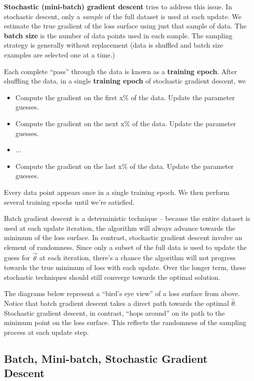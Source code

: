 \documentclass[
  letterpaper,
  DIV=11,
  numbers=noendperiod]{scrreprt}
\providecommand{\tightlist}{%
  \setlength{\itemsep}{0pt}\setlength{\parskip}{0pt}}\usepackage{longtable,booktabs,array}
\begin{document}
\textbf{Stochastic (mini-batch) gradient descent} tries to address this
issue. In stochastic descent, only a \emph{sample} of the full dataset
is used at each update. We estimate the true gradient of the loss
surface using just that sample of data. The \textbf{batch size} is the
number of data points used in each sample. The sampling strategy is
generally without replacement (data is shuffled and batch size examples
are selected one at a time.)

Each complete ``pass'' through the data is known as a \textbf{training
epoch}. After shuffling the data, in a single \textbf{training epoch} of
stochastic gradient descent, we

\begin{itemize}
\tightlist
\item
  Compute the gradient on the first x\% of the data. Update the
  parameter guesses.
\item
  Compute the gradient on the next x\% of the data. Update the parameter
  guesses.
\item
  \(\dots\)
\item
  Compute the gradient on the last x\% of the data. Update the parameter
  guesses.
\end{itemize}

Every data point appears once in a single training epoch. We then
perform several training epochs until we're satisfied.

Batch gradient descent is a deterministic technique -- because the
entire dataset is used at each update iteration, the algorithm will
always advance towards the minimum of the loss surface. In contrast,
stochastic gradient descent involve an element of randomness. Since only
a subset of the full data is used to update the guess for
\(\vec{\theta}\) at each iteration, there's a chance the algorithm will
not progress towards the true minimum of loss with each update. Over the
longer term, these stochastic techniques should still converge towards
the optimal solution.

The diagrams below represent a ``bird's eye view'' of a loss surface
from above. Notice that batch gradient descent takes a direct path
towards the optimal \(\hat{\theta}\). Stochastic gradient descent, in
contrast, ``hops around'' on its path to the minimum point on the loss
surface. This reflects the randomness of the sampling process at each
update step.

\subsection{Batch, Mini-batch, Stochastic Gradient
Descent}\label{batch-mini-batch-stochastic-gradient-descent}
\end{document}
